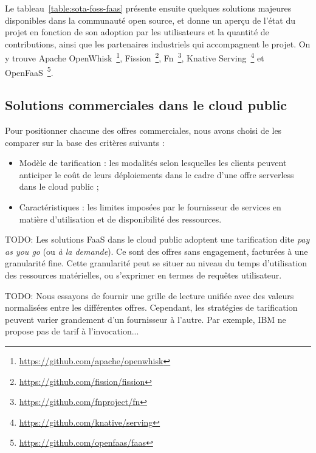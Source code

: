 Le tableau~\ref{table:sota-foss-faas} présente ensuite quelques solutions majeures disponibles dans la communauté open source, et donne un aperçu de l'état du projet en fonction de son adoption par les utilisateurs et la quantité de contributions, ainsi que les partenaires industriels qui accompagnent le projet. On y trouve Apache OpenWhisk~\footnote{\label{footnote:openwhisk}\href{https://github.com/apache/openwhisk}{https://github.com/apache/openwhisk}}, Fission~\footnote{\label{footnote:fission}\href{https://github.com/fission/fission}{https://github.com/fission/fission}}, Fn~\footnote{\label{footnote:fn}\href{https://github.com/fnproject/fn}{https://github.com/fnproject/fn}}, Knative Serving~\footnote{\label{footnote:knative}\href{https://github.com/knative/serving}{https://github.com/knative/serving}} et OpenFaaS~\footnote{\label{footnote:openfaas}\href{https://github.com/openfaas/faas}{https://github.com/openfaas/faas}}.

\subsection{Solutions commerciales dans le cloud public}

Pour positionner chacune des offres commerciales, nous avons choisi de les comparer sur la base des critères suivants :

\begin{itemize}
    \item Modèle de tarification : les modalités selon lesquelles les clients peuvent anticiper le coût de leurs déploiements dans le cadre d'une offre serverless dans le cloud public ;
    \item Caractéristiques : les limites imposées par le fournisseur de services en matière d'utilisation et de disponibilité des ressources.
\end{itemize}

TODO: Les solutions \gls{FaaS} dans le cloud public adoptent une tarification dite \textit{pay as you go} (ou \textit{à la demande}). Ce sont des offres sans engagement, facturées à une granularité fine. Cette granularité peut se situer au niveau du temps d'utilisation des ressources matérielles, ou s'exprimer en termes de requêtes utilisateur.

TODO: Nous essayons de fournir une grille de lecture unifiée avec des valeurs normalisées entre les différentes offres. Cependant, les stratégies de tarification peuvent varier grandement d'un fournisseur à l'autre. Par exemple, IBM ne propose pas de tarif à l'invocation...

